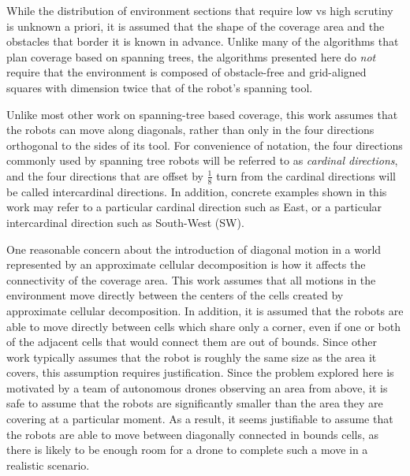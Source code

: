 \documentclass[letterpaper, 12pt, leqno]{report}
\begin{document}

While the distribution of environment sections that require low vs high scrutiny is unknown a priori, it is assumed that the shape of the coverage area and the obstacles that border it is known in advance. Unlike many of the algorithms that plan coverage based on spanning trees, the algorithms presented here do \textit{not} require that the environment is composed of obstacle-free and grid-aligned squares with dimension twice that of the robot's spanning tool. 

Unlike most other work on spanning-tree based coverage, this work assumes that the robots can move along diagonals, rather than only in the four directions orthogonal to the sides of its tool. For convenience of notation, the four directions commonly used by spanning tree robots will be referred to as \textit{cardinal directions}, and the four directions that are offset by $\frac{1}{8}$ turn from the cardinal directions will be called intercardinal directions. In addition, concrete examples shown in this work may refer to a particular cardinal direction such as East, or a particular intercardinal direction such as South-West (SW).

One reasonable concern about the introduction of diagonal motion in a world represented by an approximate cellular decomposition is how it affects the connectivity of the coverage area. This work assumes that all motions in the environment move directly between the centers of the cells created by approximate cellular decomposition. In addition, it is assumed that the robots are able to move directly between cells which share only a corner, even if one or both of the adjacent cells that would connect them are out of bounds. Since other work typically assumes that the robot is roughly the same size as the area it covers, this assumption requires justification. Since the problem explored here is motivated by a team of autonomous drones observing an area from above, it is safe to assume that the robots are significantly smaller than the area they are covering at a particular moment. As a result, it seems justifiable to assume that the robots are able to move between diagonally connected in bounds cells, as there is likely to be enough room for a drone to complete such a move in a realistic scenario.

\end{document}

